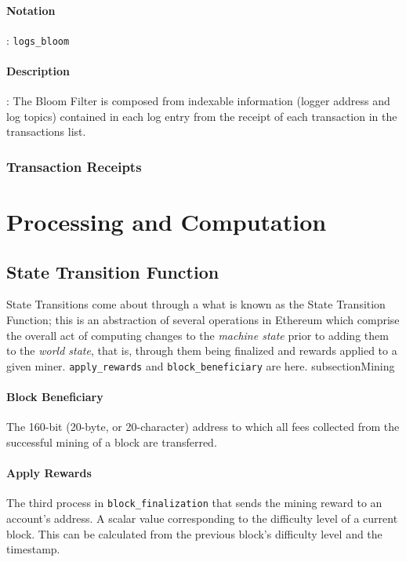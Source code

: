 \documentclass[10pt,a4paper,leqno,bibliography=totoc]{scrartcl}
\newenvironment{alphafootnotes}
{\par\edef\savedfootnotenumber{\number\value{footnote}}
\renewcommand{\thefootnote}{\alph{footnote}}
\setcounter{footnote}{0}}
{\par\setcounter{footnote}{\savedfootnotenumber}}
\begin{document}
\begin{alphafootnotes}
\begin{multicols*}{2}
				\paragraph{Notation}: \texttt{logs\_bloom}
				\paragraph{Description}: The Bloom Filter is composed from indexable information (logger address and log topics) contained in each log entry from the receipt of each transaction in the transactions list. 

		\subsubsection{Transaction Receipts}

\clearpage

	\section{Processing and Computation}
	
		\subsection{State Transition Function}
		State Transitions come about through a what is known as the State Transition Function; this is an abstraction of several operations in Ethereum which comprise the overall act of computing changes to the \textit{machine state} prior to adding them to the \textit{world state}, that is, through them being finalized and rewards applied to a given miner. \texttt{apply\_rewards} and \texttt{block\_beneficiary} are here.
		subsection{Mining}
			\paragraph{Block Beneficiary} The 160-bit (20-byte, or 20-character) address to which all fees collected from the successful mining of a block are transferred.
			\paragraph{Apply Rewards} The third process in \texttt{block\_finalization} that sends the mining reward to an account's address. A scalar value corresponding to the difficulty level of a current block. This can be calculated from the previous block's difficulty level and the timestamp. 


\end{multicols*}
\end{alphafootnotes}
\end{document}
